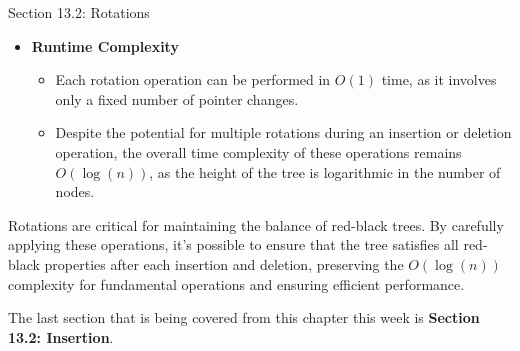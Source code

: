 \begin{notes}{Section 13.2: Rotations}
\begin{itemize}
        \item \textbf{Runtime Complexity}
        \begin{itemize}
            \item Each rotation operation can be performed in $O(1)$ time, as it involves only a fixed number of pointer changes.
            \item Despite the potential for multiple rotations during an insertion or deletion operation, the overall time complexity of these operations remains $O(\log{(n)})$, as the height of the tree 
            is logarithmic in the number of nodes.
        \end{itemize}
    \end{itemize}
    
    \begin{highlight}
        Rotations are critical for maintaining the balance of red-black trees. By carefully applying these operations, it's possible to ensure that the tree satisfies all red-black properties after 
        each insertion and deletion, preserving the $O(\log{(n)})$ complexity for fundamental operations and ensuring efficient performance.
    \end{highlight}      
\end{notes}

The last section that is being covered from this chapter this week is \textbf{Section 13.2: Insertion}.

